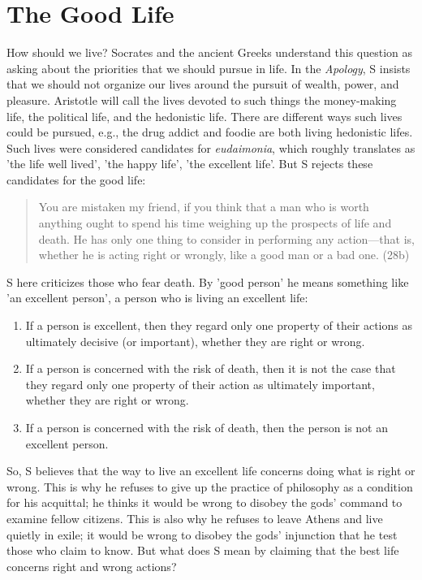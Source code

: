 \documentclass[oneside]{article}
\begin{document}
\thispagestyle{fancy}




\section*{The Good Life}

How should we live? Socrates and the ancient Greeks understand this question as asking about the priorities that we should pursue in life. In the \emph{Apology}, S insists that we should not organize our lives around the pursuit of wealth, power, and pleasure. Aristotle will call the lives devoted to such things the money-making life, the political life, and the hedonistic life. There are different ways such lives could be pursued, e.g., the drug addict and foodie are both living hedonistic lifes. Such lives were considered candidates for \emph{eudaimonia}, which roughly translates as 'the life well lived', 'the happy life', 'the excellent life'. But S rejects these candidates for the good life: 

\begin{quote}
You are mistaken my friend, if you think that a man who is worth anything ought to spend his time weighing up the prospects of life and death. He has only one thing to consider in performing any action---that is, whether he is acting right or wrongly, like a good man or a bad one. (28b)
\end{quote}
S here criticizes those who fear death. By 'good person' he means something like 'an excellent person', a person who is living an excellent life: 
\begin{enumerate}
\item If a person is excellent, then they regard only one property of their actions as ultimately decisive (or important), whether they are right or wrong.
\item If a person is concerned with the risk of death, then it is not the case that they regard only one property of their action as ultimately important, whether they are right or wrong.
\item If a person is concerned with the risk of death, then the person is not an excellent person.
\end{enumerate}
So, S believes that the way to live an excellent life concerns doing what is right or wrong. This is why he refuses to give up the practice of philosophy as a condition for his acquittal; he thinks it would be wrong to disobey the gods' command to examine  fellow citizens. This is also why he refuses to leave Athens and live quietly in exile; it would be wrong to disobey the gods' injunction that he test those who claim to know. But what does S mean by claiming that the best life concerns right and wrong actions?
\end{document}
